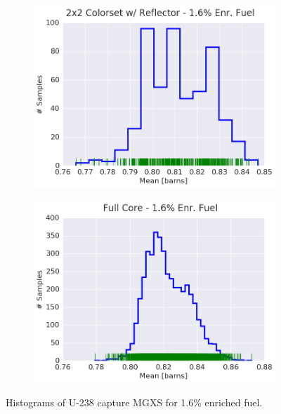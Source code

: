 \begin{figure}[h!]
\begin{subfigure}{0.5\textwidth}
  \caption{}
  \label{fig:chap9-hist-2x2-1.6-capt}
\end{subfigure}
\begin{subfigure}{0.5\textwidth}
  \centering
  \includegraphics[width=\linewidth]{figures/patterns/reflector/hist-kde-rug/16-enr-capt-1}  \caption{}
  \label{fig:chap9-hist-reflector-1.6-capt}
\end{subfigure}%
\begin{subfigure}{0.5\textwidth}
  \centering
  \includegraphics[width=\linewidth]{figures/patterns/full-core/hist-kde-rug/16-enr-capt-1} \caption{}
  \label{fig:chap9-hist-full-core-1.6-capt}
\end{subfigure}
\caption[Histogram of U-238 capture MGXS for 1.6\% enriched fuel]{Histograms of U-238 capture \ac{MGXS} for 1.6\% enriched fuel.}
\label{fig:chap9-hist-1.6-capt}
\end{figure}

